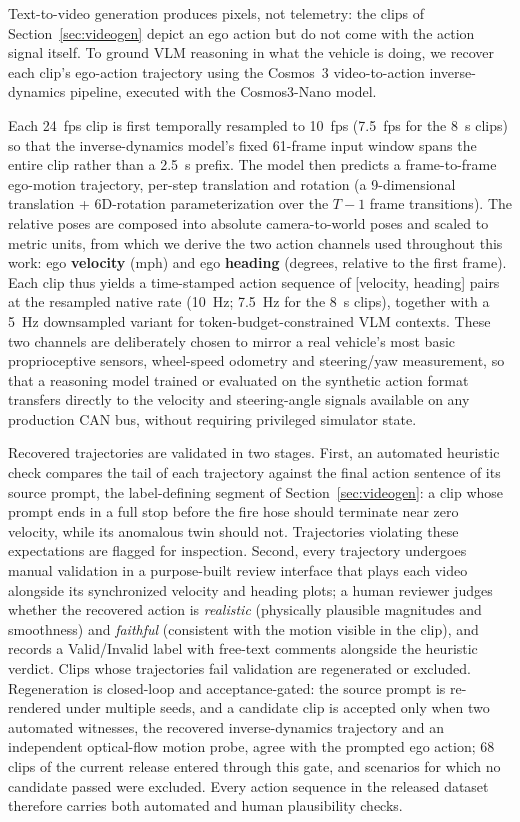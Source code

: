 \documentclass[conference]{IEEEtran}
\begin{document}
Text-to-video generation produces pixels, not telemetry: the clips of Section~\ref{sec:videogen} depict an ego action but do not come with the action signal itself. To ground VLM reasoning in what the vehicle is doing, we recover each clip's ego-action trajectory using the Cosmos~3 video-to-action inverse-dynamics pipeline, executed with the Cosmos3-Nano model.

Each 24~fps clip is first temporally resampled to 10~fps (7.5~fps for the 8~s clips) so that the inverse-dynamics model's fixed 61-frame input window spans the entire clip rather than a 2.5~s prefix. The model then predicts a frame-to-frame ego-motion trajectory, per-step translation and rotation (a 9-dimensional translation + 6D-rotation parameterization over the $T-1$ frame transitions). The relative poses are composed into absolute camera-to-world poses and scaled to metric units, from which we derive the two action channels used throughout this work: ego \textbf{velocity} (mph) and ego \textbf{heading} (degrees, relative to the first frame). Each clip thus yields a time-stamped action sequence of [velocity, heading] pairs at the resampled native rate (10~Hz; 7.5~Hz for the 8~s clips), together with a 5~Hz downsampled variant for token-budget-constrained VLM contexts. These two channels are deliberately chosen to mirror a real vehicle's most basic proprioceptive sensors, wheel-speed odometry and steering/yaw measurement, so that a reasoning model trained or evaluated on the synthetic action format transfers directly to the velocity and steering-angle signals available on any production CAN bus, without requiring privileged simulator state.

Recovered trajectories are validated in two stages. First, an automated heuristic check compares the tail of each trajectory against the final action sentence of its source prompt, the label-defining segment of Section~\ref{sec:videogen}: a clip whose prompt ends in a full stop before the fire hose should terminate near zero velocity, while its anomalous twin should not. Trajectories violating these expectations are flagged for inspection. Second, every trajectory undergoes manual validation in a purpose-built review interface that plays each video alongside its synchronized velocity and heading plots; a human reviewer judges whether the recovered action is \emph{realistic} (physically plausible magnitudes and smoothness) and \emph{faithful} (consistent with the motion visible in the clip), and records a Valid/Invalid label with free-text comments alongside the heuristic verdict. Clips whose trajectories fail validation are regenerated or excluded. Regeneration is closed-loop and acceptance-gated: the source prompt is re-rendered under multiple seeds, and a candidate clip is accepted only when two automated witnesses, the recovered inverse-dynamics trajectory and an independent optical-flow motion probe, agree with the prompted ego action; 68 clips of the current release entered through this gate, and scenarios for which no candidate passed were excluded. Every action sequence in the released dataset therefore carries both automated and human plausibility checks.
\end{document}
